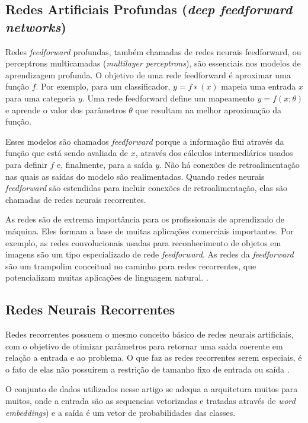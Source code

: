 \documentclass[12pt]{article}
\begin{document}
\subsection{Redes Artificiais Profundas (\textit{deep feedforward networks})}

Redes \textit{feedforward} profundas, também chamadas de redes neurais feedforward, ou perceptrons multicamadas (\textit{multilayer perceptrons}), são essenciais nos modelos de aprendizagem profunda. O objetivo de uma rede feedforward é aproximar uma função $f$. Por exemplo, para um classificador, $y = f ∗ (x)$ mapeia uma entrada $x$ para uma categoria $y$. Uma rede feedforward define um mapeamento $y = f (x; θ)$ e aprende o valor dos parâmetros $θ$ que resultam na melhor aproximação da função.

Esses modelos são chamados \textit{feedforward} porque a informação flui através da função que está sendo avaliada de $x$, através dos cálculos intermediários usados ​​para definir $f$ e, finalmente, para a saída $y$. Não há conexões de retroalimentação nas quais as saídas do modelo são realimentadas. Quando redes neurais \textit{feedforward} são estendidas para incluir conexões de retroalimentação, elas são chamadas de redes neurais recorrentes.

As redes  são de extrema importância para os profissionais de aprendizado de máquina. Eles formam a base de muitas aplicações comerciais importantes. Por exemplo, as redes convolucionais usadas para reconhecimento de objetos em imagens são um tipo especializado de rede \textit{feedforward}. As redes da \textit{feedforward} são um trampolim conceitual no caminho para redes recorrentes, que potencializam muitas aplicações de linguagem natural. \cite{Goodfellow-et-al-2016}.

\subsection{Redes Neurais Recorrentes}

Redes recorrentes possuem o mesmo conceito básico de redes neurais artificiais, com o objetivo de otimizar parâmetros para retornar uma saída coerente em relação a entrada e ao problema. O que faz as redes recorrentes serem especiais, é o fato de elas não possuirem a restrição de tamanho fixo de entrada ou saída \cite{karpathy:2015}.

O conjunto de dados utilizados nesse artigo se adequa a arquitetura muitos para muitos, onde a entrada são as sequencias vetorizadas e tratadas através de \textit{word embeddings}) e a saída é um vetor de probabilidades das classes.
\end{document}
